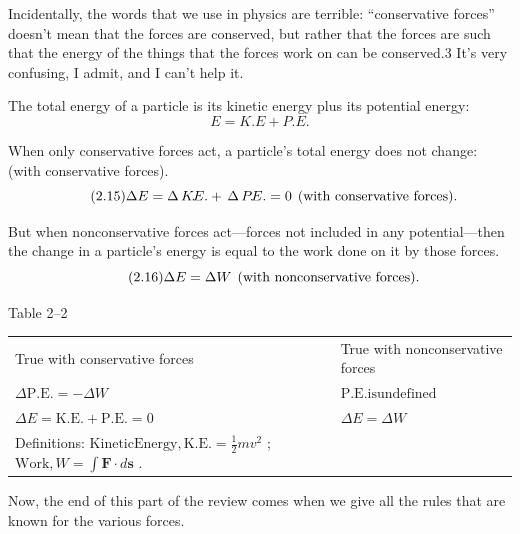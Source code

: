 \documentclass[11pt,oneside]{article}
\providecommand{\FLPF}{\mathbf{F}}
\providecommand{\FLPs}{\mathbf{s}}
\begin{document}
Incidentally, the words that we use in physics are terrible: ``conservative forces'' doesn't mean that the forces are conserved, but rather that the forces are such that the energy of the things that the forces work on can be conserved.3 It's very confusing, I admit, and I can't help it.\par

The total energy of a particle is its kinetic energy plus its potential energy: 
\begin{equation*} \tag{2.14}
\label{Eq:TIPS:2:14} E = K\!.\!E+P\!.\!E. \end{equation*}
\par

When only conservative forces act, a particle's total energy does not change: (with conservative forces). 
\begin{equation*} \tag{2.15}
\label{Eq:TIPS:2:15} \Delta E = \Delta\,K\!.\!E.+\,\Delta\,P\!.\!E.=0\hskip1ex(\text{with }\mathrm{conservative}\text{ forces}). \end{equation*}
\par

But when nonconservative forces act---forces not included in any potential---then the change in a particle's energy is equal to the work done on it by those forces. 
\begin{equation*} \tag{2.16}
\label{Eq:TIPS:2:16} \Delta E = \Delta W\hskip1ex(\text{with }\mathrm{nonconservative}\text{ forces}). \end{equation*}
\par

\begin{center}
{\small Table 2--2}\par\smallskip
\begin{tabular}{ll}
True with conservative forces & True with nonconservative forces\\
\(\Delta\mathrm{P.E.} = -\Delta W\) & \(\mathrm{P.E. is undefined}\)\\
\(\Delta E = \mathrm{K.E.} + \mathrm{P.E.} = 0\) & \(\Delta E = \Delta W\)\\
Definitions: \(\mathrm{Kinetic Energy, K.E.}=\frac12mv^2\) ; \(\mathrm{Work, } W=\int \FLPF\cdot d\FLPs\) . & {}
\end{tabular}
\end{center}

Now, the end of this part of the review comes when we give all the rules that are known for the various forces.\par
\end{document}
